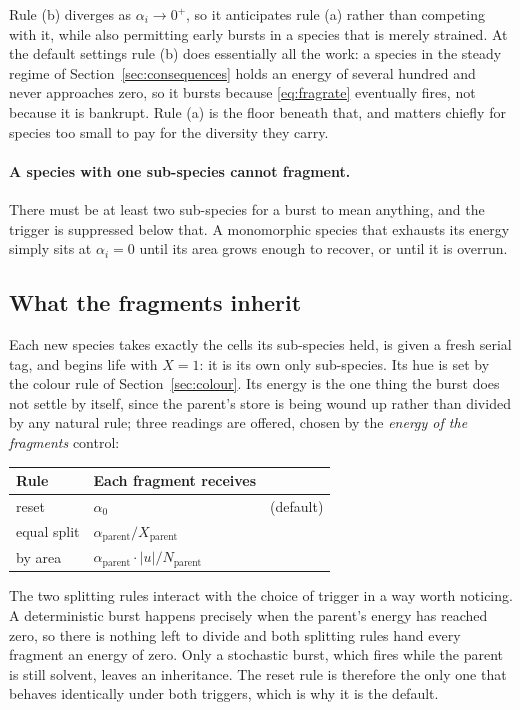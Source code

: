 \documentclass[11pt,a4paper]{article}
\begin{document}
\noindent
Rule (b) diverges as $\alpha_i \to 0^{+}$, so it anticipates rule (a) rather than
competing with it, while also permitting early bursts in a species that is merely
strained. At the default settings rule (b) does essentially all the work: a species in
the steady regime of Section~\ref{sec:consequences} holds an energy of several hundred
and never approaches zero, so it bursts because \eqref{eq:fragrate} eventually fires, not
because it is bankrupt. Rule (a) is the floor beneath that, and matters chiefly for
species too small to pay for the diversity they carry.

\paragraph{A species with one sub-species cannot fragment.} There must be at least two
sub-species for a burst to mean anything, and the trigger is suppressed below that. A
monomorphic species that exhausts its energy simply sits at $\alpha_i = 0$ until its area
grows enough to recover, or until it is overrun.

\subsection{What the fragments inherit}

Each new species takes exactly the cells its sub-species held, is given a fresh serial
tag, and begins life with $X = 1$: it is its own only sub-species. Its hue is set by the
colour rule of Section~\ref{sec:colour}. Its energy is the one thing the burst does not
settle by itself, since the parent's store is being wound up rather than divided by any
natural rule; three readings are offered, chosen by the \emph{energy of the fragments}
control:

\begin{center}
\begin{tabular}{lll}
\toprule
Rule & Each fragment receives & \\
\midrule
reset      & $\alpha_0$                                     & (default) \\
equal split& $\alpha_{\text{parent}} / X_{\text{parent}}$    & \\
by area    & $\alpha_{\text{parent}} \cdot |u| / N_{\text{parent}}$ & \\
\bottomrule
\end{tabular}
\end{center}

\noindent
The two splitting rules interact with the choice of trigger in a way worth noticing.
A deterministic burst happens precisely when the parent's energy has reached zero, so
there is nothing left to divide and both splitting rules hand every fragment an energy of
zero. Only a stochastic burst, which fires while the parent is still solvent, leaves an
inheritance. The reset rule is therefore the only one that behaves identically under both
triggers, which is why it is the default.
\end{document}
